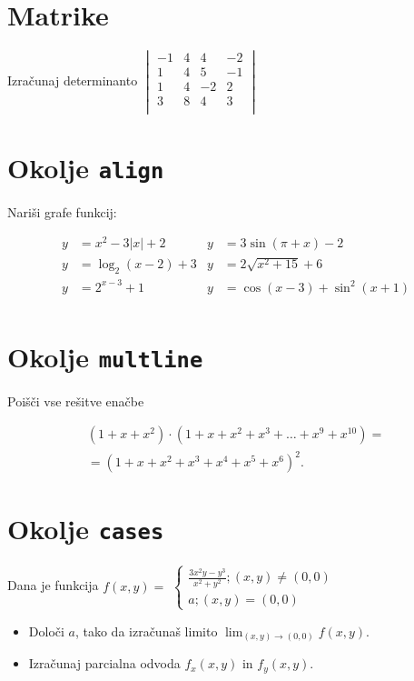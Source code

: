 \documentclass[a4paper,12pt]{article}
\begin{document}
\section*{Matrike}
Izračunaj determinanto
  $\begin{vmatrix}
	  -1 & 4 & 4 & -2 \\
    1 & 4 & 5 & -1 \\
    1 & 4 & -2 & 2 \\
    3 & 8 & 4 & 3 \\
\end{vmatrix}$

\section*{Okolje \texttt{align}}
Nariši grafe funkcij:

\begin{align*}
y &= x^2 - 3|x| + 2  &  y &= 3 \sin(\pi+x) - 2\\
y &= \log_2(x-2) + 3  & y &= 2 \sqrt{x^2+15} + 6\\
y &= 2^{x-3} + 1      & y &= \cos(x-3) + \sin^2(x+1)\\
\end{align*}


\section*{Okolje \texttt{multline}}
Poišči vse rešitve enačbe

\begin{multline*}
	(1+x+x^2) \cdot (1+x+x^2+x^3+\ldots+x^9+x^{10}) =\\
=(1+x+x^2+x^3+x^4+x^5+x^6)^2.
\end{multline*}


\section*{Okolje \texttt{cases}}
Dana je funkcija $f(x,y)=$
   $ \begin{cases}
	\frac{3x^2y-y^3}{x^2+y^2}; (x,y)\neq(0,0)\\a; (x,y)=(0,0)
\end{cases}$
\begin{itemize}
\item Določi \(a\), tako da izračunaš limito \( \lim_{(x,y)\to(0,0)} f(x,y) \).
\item Izračunaj parcialna odvoda \(f_x(x,y)\) in \(f_y(x,y)\).
\end{itemize}
\end{document}
